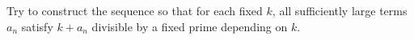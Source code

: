 Try to construct the sequence so that for each fixed $k$, all sufficiently large terms $a_n$ satisfy $k + a_n$ divisible by a fixed prime depending on $k$.
